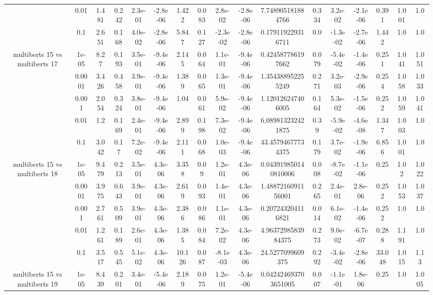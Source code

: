 \begin{tabular}{|c|c|c|c|c|c|c|c|c|c|c|c|c|c|c|c|c|}
 & 0.01 & 1.481 & 0.242 & 2.3e-01 & -2.8e-06 & 1.422 & 0.083 & 2.8e-02 & -2.8e-06 & 7.748905181884766 & 0.334 & 3.2e-02 & -2.1e-06 & 0.391 & 1.001 & 1.0 \\
 & 0.1 & 2.651 & 0.168 & 4.0e-02 & -2.8e-06 & 5.847 & 0.127 & -2.3e-02 & -2.8e-06 & 0.179119229316711 & 0.0 & -1.3e-02 & -2.7e-06 & 1.442 & 1.0 & 1.0 \\
\hline
\multirow{5}{*}{multiberts 15 vs multiberts 17} & 1e-05 & 8.27 & 0.193 & 3.5e-01 & -9.4e-06 & 2.145 & 0.064 & 1.1e-01 & -9.4e-06 & 0.424587786197662 & 0.079 & -5.4e-02 & -1.4e-06 & 0.251 & 1.041 & 1.051 \\
 & 0.0001 & 3.426 & 0.458 & 3.9e-01 & -9.4e-06 & 1.389 & 0.065 & 1.3e-01 & -9.4e-06 & 1.354388952255249 & 0.271 & 3.2e-03 & -2.9e-06 & 0.254 & 1.058 & 1.033 \\
 & 0.001 & 2.054 & 0.324 & 3.8e-01 & -9.4e-06 & 1.04 & 0.061 & 5.9e-02 & -9.4e-06 & 1.120126247406005 & 0.164 & 5.3e-02 & -1.5e-06 & 0.252 & 1.059 & 1.041 \\
 & 0.01 & 1.2 & 0.169 & 2.4e-01 & -9.4e-06 & 2.899 & 0.198 & 7.3e-02 & -9.4e-06 & 6.089813232421875 & 0.39 & -5.9e-02 & -4.6e-08 & 1.347 & 1.003 & 1.0 \\
 & 0.1 & 3.042 & 0.17 & 7.2e-02 & -9.4e-06 & 2.111 & 0.068 & 1.0e-03 & -9.4e-06 & 43.45794677734375 & 0.179 & 3.7e-02 & -1.9e-06 & 6.856 & 1.001 & 1.0 \\
\hline
\multirow{5}{*}{multiberts 15 vs multiberts 18} & 1e-05 & 9.479 & 0.213 & 3.5e-01 & 4.3e-06 & 3.358 & 0.09 & 1.2e-01 & 4.3e-06 & 0.043919850140810006 & 0.008 & -8.7e-02 & -1.1e-06 & 0.25 & 1.02 & 1.022 \\
 & 0.0001 & 3.975 & 0.643 & 3.9e-01 & 4.3e-06 & 2.619 & 0.093 & 1.4e-01 & 4.3e-06 & 1.4887216091156001 & 0.265 & 2.4e-01 & 2.8e-06 & 0.252 & 1.053 & 1.037 \\
 & 0.001 & 2.761 & 0.509 & 3.9e-01 & 4.3e-06 & 2.386 & 0.086 & 1.1e-01 & 4.3e-06 & 0.207243204116821 & 0.014 & 6.1e-02 & -1.4e-06 & 0.252 & 1.0 & 1.0 \\
 & 0.01 & 1.261 & 0.189 & 2.6e-01 & 4.3e-06 & 1.385 & 0.084 & 7.2e-02 & 4.3e-06 & 4.9637298583984375 & 0.273 & 9.0e-02 & -6.7e-07 & 0.288 & 1.191 & 1.0 \\
 & 0.1 & 3.517 & 0.545 & 5.1e-02 & 4.3e-06 & 10.126 & 0.087 & -8.1e-03 & 4.3e-06 & 24.5277099609375 & 0.292 & -3.4e-02 & -2.8e-06 & 33.048 & 1.015 & 1.13 \\
\hline
\multirow{5}{*}{multiberts 15 vs multiberts 19} & 1e-05 & 8.439 & 0.201 & 3.4e-01 & -5.4e-06 & 2.189 & 0.075 & 1.2e-01 & -5.4e-06 & 0.042424693703651005 & 0.007 & -1.1e-01 & 1.8e-06 & 0.25 & 1.0 & 1.005 \\

\end{tabular}
